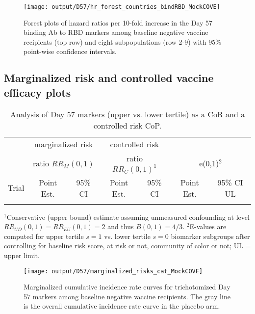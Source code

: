 \documentclass[
]{article}
\begin{document}
\begin{figure}[H]
    \centering
    \texttt{[image: output/D57/hr\_forest\_countries\_bindRBD\_MockCOVE]}
    \caption{Forest plots of hazard ratios per 10-fold increase in the  Day 57 binding Ab to RBD markers among baseline negative vaccine recipients (top row) and eight subpopulations (row 2-9) with 95\% point-wise confidence intervals.}
\end{figure}

\fi

\hypertarget{marginalized-risk-and-controlled-vaccine-efficacy-plots}{%
\subsection{Marginalized risk and controlled vaccine efficacy plots}\label{marginalized-risk-and-controlled-vaccine-efficacy-plots}}

\begin{center}
\begingroup
\renewcommand{\arraystretch}{2} %
\begin{table}[H] \centering
\doublespacing
\singlespacing
\begin{tabular}{lcccccc} \hline \hline
 & \multicolumn{2}{c}{marginalized risk} & \multicolumn{2}{c}{controlled risk} & & \\ 
 & \multicolumn{2}{c}{ratio $RR_M(0,1)$} & \multicolumn{2}{c}{ratio $RR_C(0,1)^1$} & \multicolumn{2}{c}{e(0,1)$^2$} \\ 
Trial  & Point Est. & 95\% CI  &    Point Est. & 95\% CI  &   Point Est.  & 95\% CI UL \\ \hline
  \\ \hline \hline
\end{tabular}
\newline
\caption{Analysis of Day 57 markers (upper vs. lower tertile) as a CoR and a controlled risk CoP.}
\doublespacing
\noindent $^1$Conservative (upper bound) estimate assuming unmeasured confounding at level $RR_{UD}(0,1)=RR_{EU}(0,1) = 2$ and thus $B(0,1)=4/3$. \newline
\noindent $^2$E-values are computed for upper tertile $s=1$ vs. lower tertile $s=0$ biomarker subgroups after controlling for baseline risk score, at risk or not, community of color or not; UL = upper limit.
\label{table1}
\end{table}
\endgroup
\end{center}

\begin{figure}[H]
    \centering
    \texttt{[image: output/D57/marginalized\_risks\_cat\_MockCOVE]}
    \caption{Marginalized cumulative incidence rate curves for trichotomized Day 57 markers among baseline negative vaccine recipients. The gray line is the overall cumulative incidence rate curve in the placebo arm.}
\end{figure}
\end{document}
